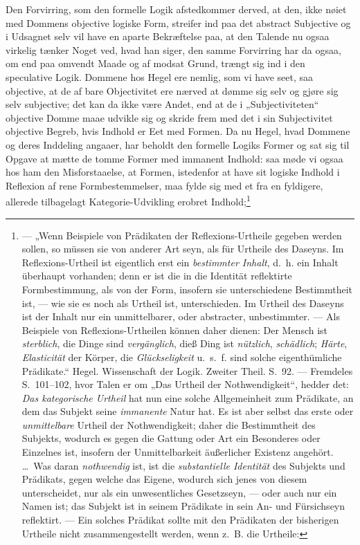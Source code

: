 \documentclass[12pt]{book}
\begin{document}
Den Forvirring, som den formelle Logik afstedkommer derved, at den, ikke nøiet med Dommens objective logiske Form, streifer ind paa det abstract Subjective og i Udsagnet selv vil have en aparte Bekræftelse paa, at den Talende nu ogsaa virkelig tænker Noget ved, hvad han siger, den samme Forvirring har da ogsaa, om end paa omvendt Maade og af modsat Grund, trængt sig ind i den speculative Logik. Dommene hos Hegel ere nemlig, som vi have seet, saa objective, at de af bare Objectivitet ere nærved at dømme sig selv og gjøre sig selv subjective; det kan da ikke være Andet, end at de i „Subjectiviteten“ objective Domme maae udvikle sig og skride frem med det i sin Subjectivitet objective Begreb, hvis Indhold er Eet med Formen. Da nu Hegel, hvad Dommene og deres Inddeling angaaer, har beholdt den formelle Logiks Former og sat sig til Opgave at mætte de tomme Former med immanent Indhold: saa møde vi ogsaa hos ham den Misforstaaelse, at Formen, istedenfor at have sit logiske Indhold i Reflexion af rene Formbestemmelser, maa fylde sig med et fra en fyldigere, allerede tilbagelagt Kategorie-Udvikling erobret Indhold;\footnote{--- „Wenn Beispiele von Prädikaten der Reflexions-Urtheile gegeben werden sollen, so müssen sie von anderer Art seyn, als für Urtheile des Daseyns. Im Reflexions-Urtheil ist eigentlich erst ein \emph{bestimmter Inhalt}, d.~h. ein Inhalt überhaupt vorhanden; denn er ist die in die Identität reflektirte Formbestimmung, als von der Form, insofern sie unterschiedene Bestimmtheit ist, --- wie sie es noch als Urtheil ist, unterschieden. Im Urtheil des Daseyns ist der Inhalt nur ein unmittelbarer, oder abstracter, unbestimmter. --- Als Beispiele von Reflexions-Urtheilen können daher dienen: Der Mensch ist \emph{sterblich}, die Dinge sind \emph{vergänglich}, %
dieß Ding ist \emph{nützlich}, \emph{schädlich}; \emph{Härte}, \emph{Elasticität} der Körper, die \emph{Glückseligkeit} u.~s.~f. sind solche eigenthümliche Prädikate.“ Hegel. Wissenschaft der Logik. Zweiter Theil. S.~92. --- Fremdeles S.~101--102, hvor Talen er om „Das Urtheil der Nothwendigkeit“, hedder det: \emph{Das kategorische Urtheil} hat nun eine solche Allgemeinheit zum Prädikate, an dem das Subjekt seine \emph{immanente} Natur hat. Es ist aber selbst das erste oder \emph{unmittelbare} Urtheil der Nothwendigkeit; daher die Bestimmtheit des Subjekts, wodurch es gegen die Gattung oder Art ein Besonderes oder Einzelnes ist, insofern der Unmittelbarkeit äußerlicher Existenz angehört. \dots\ Was daran \emph{nothwendig} ist, ist die \emph{substantielle Identität} des Subjekts und Prädikats, gegen welche das Eigene, wodurch sich jenes von diesem unterscheidet, nur als ein unwesentliches Gesetzseyn, --- oder auch nur ein Namen ist; das Subjekt ist in seinem Prädikate in sein An- und Fürsichseyn reflektirt. --- Ein solches Prädikat sollte mit den Prädikaten der bisherigen Urtheile nicht zusammengestellt werden, wenn z.~B. die Urtheile:
}
\end{document}
